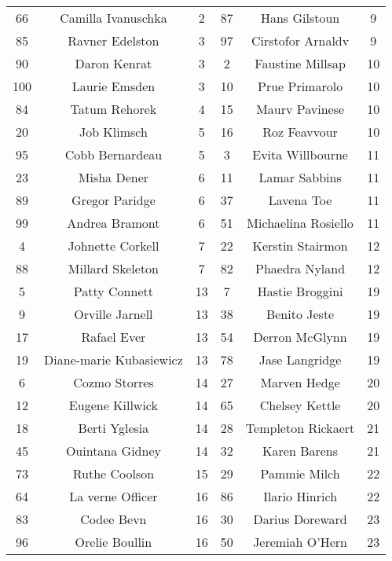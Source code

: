 \documentclass[11pt,letterpaper]{article}
\begin{document}
\begin{enumerate}
\begin{center}
\begin{tabular}{ | c  c  c |  c c c | }
66 & Camilla Ivanuschka & 2 & 87 & Hans Gilstoun & 9 \\
85 & Ravner Edelston & 3 & 97 & Cirstofor Arnaldv & 9 \\
90 & Daron Kenrat & 3 & 2 & Faustine Millsap & 10 \\
100 & Laurie Emsden & 3 & 10 & Prue Primarolo & 10 \\

84 & Tatum Rehorek & 4 & 15 & Maurv Pavinese & 10 \\
20 & Job Klimsch & 5 & 16 & Roz Feavvour & 10 \\
95 & Cobb Bernardeau & 5 & 3 & Evita Willbourne & 11 \\
23 & Misha Dener & 6 & 11 & Lamar Sabbins & 11 \\

89 & Gregor Paridge & 6 & 37 & Lavena Toe & 11 \\
99 & Andrea Bramont & 6 & 51 & Michaelina Rosiello & 11 \\
4 & Johnette Corkell & 7 & 22 & Kerstin Stairmon & 12 \\
88 & Millard Skeleton & 7 & 82 & Phaedra Nyland & 12 \\
\hline
\hline
5 & Patty Connett & 13 & 7 & Hastie Broggini & 19 \\
9 & Orville Jarnell & 13 & 38 & Benito Jeste & 19 \\
17 & Rafael Ever & 13 & 54 & Derron McGlynn & 19 \\
19 & Diane-marie Kubasiewicz & 13 & 78 & Jase Langridge & 19 \\

6 & Cozmo Storres & 14 & 27 & Marven Hedge & 20 \\
12 & Eugene Killwick & 14 & 65 & Chelsey Kettle & 20 \\
18 & Berti Yglesia & 14 & 28 & Templeton Rickaert & 21 \\
45 & Ouintana Gidney & 14 & 32 & Karen Barens & 21 \\

73 & Ruthe Coolson & 15 & 29 & Pammie Milch & 22 \\
64 & La verne Officer & 16 & 86 & Ilario Hinrich & 22 \\
83 & Codee Bevn & 16 & 30 & Darius Doreward & 23 \\
96 & Orelie Boullin & 16 & 50 & Jeremiah O'Hern & 23 \\


\end{tabular}
\end{center}
\end{enumerate}
\end{document}
